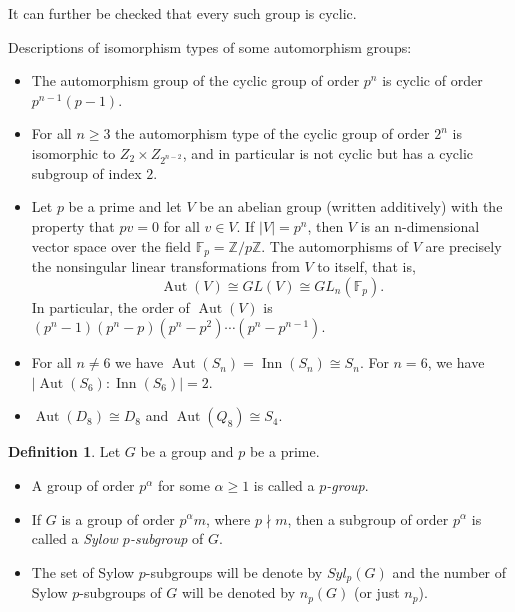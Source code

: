 \documentclass{article}
\DeclareMathOperator{\Aut}{Aut}
\DeclareMathOperator{\Inn}{Inn}
\numberwithin{equation}{section}
\theoremstyle{definition}
\newtheorem{definition}{Definition}
\numberwithin{definition}{section}
\numberwithin{theorem}{section}
\theoremstyle{remark}
\numberwithin{exercise}{section}
\begin{document}
    It can further be checked that every such group is cyclic.
    
    Descriptions of isomorphism types of some automorphism groups:
    
    \begin{itemize}
        \item The automorphism group of the cyclic group of order $p^n$ is cyclic of order $p^{n-1}(p-1)$.
        \item For all $n\geq 3$ the automorphism type of the cyclic group of order $2^n$ is isomorphic to $Z_{2}\times Z_{2^{n-2}}$, and in particular is not cyclic but has a cyclic subgroup of index $2$.
        \item Let $p$ be a prime and let $V$ be an abelian group (written additively) with the property that $pv=0$ for all $v\in V$. If $|V|=p^n$, then $V$ is an n-dimensional vector space over the field $\mathbb{F}_p=\mathbb{Z}/p\mathbb{Z}$. The automorphisms of $V$ are precisely the nonsingular linear transformations from $V$ to itself, that is, $$\Aut(V)\cong GL(V)\cong GL_n(\mathbb{F}_p).$$ In particular, the order of $\Aut(V)$ is $(p^{n}-1)(p^{n}-p)(p^{n}-p^{2})\cdots(p^n-p^{n-1})$.
        \item For all $n\neq 6$ we have $\Aut(S_{n})=\Inn(S_{n})\cong S_{n}$. For $n=6$, we have $|\Aut(S_{6})\mathrel{:}\Inn(S_{6})|=2$.
        \item $\Aut(D_8)\cong D_8$ and $\Aut(Q_8)\cong S_4$.
    \end{itemize}
    
    \begin{definition}
    Let $G$ be a group and $p$ be a prime.
    \begin{itemize}
        \item A group of order $p^{\alpha}$ for some $\alpha\geq 1$ is called a \textit{$p$-group}.
        \item If $G$ is a group of order $p^{\alpha}m$, where $p\nmid m$, then a subgroup of order $p^{\alpha}$ is called a \textit{Sylow $p$-subgroup} of $G$.
        \item The set of Sylow $p$-subgroups will be denote by $Syl_{p}(G)$ and the number of Sylow $p$-subgroups of $G$ will be denoted by $n_{p}(G)$ (or just $n_p$).
    \end{itemize}
    \end{definition}
    
\end{document}
